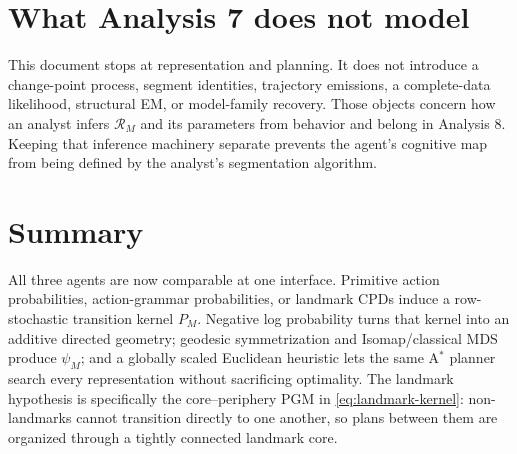 \documentclass[11pt]{article}
\begin{document}
\section{What Analysis 7 does not model}

This document stops at representation and planning. It does not introduce a
change-point process, segment identities, trajectory emissions, a complete-data
likelihood, structural EM, or model-family recovery. Those objects concern how an analyst
infers $\mathcal R_M$ and its parameters from behavior and belong in Analysis 8. Keeping
that inference machinery separate prevents the agent's cognitive map from being defined
by the analyst's segmentation algorithm.

\section{Summary}

All three agents are now comparable at one interface. Primitive action probabilities,
action-grammar probabilities, or landmark CPDs induce a row-stochastic transition kernel
$P_M$. Negative log probability turns that kernel into an additive directed geometry;
geodesic symmetrization and Isomap/classical MDS produce $\psi_M$; and a globally scaled
Euclidean heuristic lets the same A$^\ast$ planner search every representation without
sacrificing optimality. The landmark hypothesis is specifically the core--periphery PGM
in \eqref{eq:landmark-kernel}: non-landmarks cannot transition directly to one another, so
plans between them are organized through a tightly connected landmark core.
\end{document}

